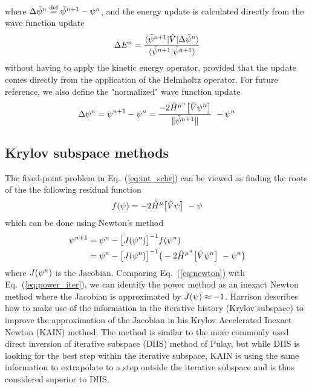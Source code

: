 where $\Delta \tilde{\psi}^{n} \stackrel{\text{def}}{\hbox{=}} \tilde{\psi}^{n+1} - \psi^{n}$,
and the energy update is calculated directly from the wave function update
\begin{equation}
    \label{eq:energy_update}
    \Delta E^n = 
	\frac{\langle\tilde{\psi}^{n+1}| \hat{V} |\Delta\tilde{\psi}^{n}\rangle}
	{\langle\tilde{\psi}^{n+1}|\tilde{\psi}^{n+1}\rangle}
\end{equation}
without having to apply the kinetic energy operator, provided that the update comes directly 
from the application of the Helmholtz operator. For future reference, we also define the "normalized"
wave function update 
\begin{equation}
    \label{eq:wavefunction_update}
    \Delta\wavefunction^n = \wavefunction^{n+1} - \wavefunction^n = 
	\frac{-2\hat{H}^{\mu^n}\big[\hat{V}\wavefunction^n\big]}{\|\tilde{\wavefunction}^{n+1}\|} 
	- \wavefunction^n
\end{equation}

\subsection{Krylov subspace methods}
The fixed-point problem in Eq.~(\ref{eq:int_schr}) can be viewed as finding 
the roots of the the following residual function
\begin{equation}
    f(\wavefunction) =  -2 \hat{H}^{\mu}\big[\hat{V}\wavefunction\big] - \wavefunction
\end{equation}
which can be done using Newton's method
\begin{align}
    \wavefunction^{n+1}	&= \wavefunction^n - \big[J(\wavefunction^n)\big]^{-1}f(\wavefunction^n)\\
    \label{eq:newton}
	&= \wavefunction^n - \big[J(\wavefunction^n)\big]^{-1}
	    \big(-2\hat{H}^{\mu^n}\big[\hat{V}\wavefunction^n\big] - \wavefunction^n\big)
\end{align}
where $J(\psi^n)$ is the Jacobian. Comparing Eq.~(\ref{eq:newton}) with 
Eq.~(\ref{eq:power_iter}), we can identify the power method as an inexact 
Newton method where the Jacobian is approximated by $J(\psi) \approx -1$.
Harrison\cite{Harrison} describes how to make use of the information in the
iterative history (Krylov subspace) to improve the approximation of the 
Jacobian in his Krylov Accelerated Inexact Newton (KAIN) method. The method 
is similar to the more commonly used direct inversion of iterative subspace 
(DIIS) method of Pulay\cite{Pulay}, but while DIIS is looking for the best 
step within the iterative subspace, KAIN is using the same information to 
extrapolate to a step outside the iterative subspace and is thus considered 
superior to DIIS\cite{Harrison}.

